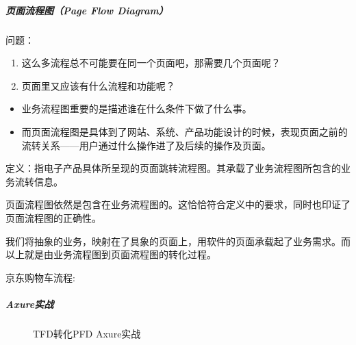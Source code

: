 \documentclass[letterpaper,11pt,english]{sphinxmanual}
\begin{document}
\subparagraph{页面流程图（Page Flow Diagram）}
\label{\detokenize{chapter_knowledge/flow_chart:page-flow-diagram}}\label{\detokenize{chapter_knowledge/flow_chart:axure-1}}
问题：
\begin{enumerate}
%
\item {} 
这么多流程总不可能要在同一个页面吧，那需要几个页面呢？

\item {} 
页面里又应该有什么流程和功能呢？

\end{enumerate}
\begin{itemize}
\item {} 
业务流程图重要的是描述谁在什么条件下做了什么事。

\item {} 
而页面流程图是具体到了网站、系统、产品功能设计的时候，表现页面之前的流转关系——用户通过什么操作进了及后续的操作及页面。

\end{itemize}

定义：指电子产品具体所呈现的页面跳转流程图。其承载了业务流程图所包含的业务流转信息。

页面流程图依然是包含在业务流程图的。这恰恰符合定义中的要求，同时也印证了页面流程图的正确性。

我们将抽象的业务，映射在了具象的页面上，用软件的页面承载起了业务需求。而以上就是由业务流程图到页面流程图的转化过程。

京东购物车流程:


\subparagraph{Axure实战}
\label{\detokenize{chapter_knowledge/flow_chart:id10}}
\begin{figure}[H]
\centering
\capstart

\noindent{}
\caption{TFD转化PFD Axure实战}\label{\detokenize{chapter_knowledge/flow_chart:id38}}\label{\detokenize{chapter_knowledge/flow_chart:flow-chart2page-axure}}\end{figure}
\end{document}
